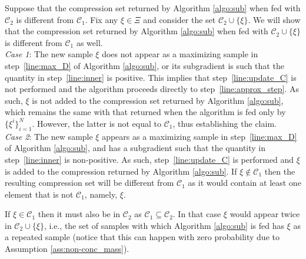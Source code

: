 \begin{enumerate}[wide, labelwidth=!, labelindent=0pt]
Suppose that the compression set returned by Algorithm \ref{algo:sub} when fed with $\mathcal{C}_2$ is different from 
$\mathcal{C}_1$. 
          Fix any $\xi \in \Xi$ and consider the set $\mathcal{C}_2 \cup \{\xi\}$. We will show that the compression set returned by Algorithm \ref{algo:sub} when fed with $\mathcal{C}_2 \cup \{\xi\}$ is different from $\mathcal{C}_1$ as well.\\
          \emph{Case 1}: The new sample $\xi$ does not appear as a maximizing sample in step~\ref{line:max_D} of Algorithm \ref{algo:sub}, or its subgradient is such that the quantity in step~\ref{line:inner} is positive. This implies that step~\ref{line:update_C} is not performed and the algorithm proceeds directly to step~\ref{line:approx_step}. As such, $\xi$ is not added to the compression set returned by Algorithm \ref{algo:sub}, which remains the same with that returned when the algorithm is fed only by $\{\xi^i\}_{i=1}^N$. However, the latter is not equal to $\mathcal{C}_1$, thus establishing the claim.\\  
	       \emph{Case 2}: The new sample $\xi$ appears as a maximizing sample in step~\ref{line:max_D} of Algorithm \ref{algo:sub}, and has a subgradient such that the quantity in step~\ref{line:inner} is non-positive. As such, step~\ref{line:update_C} is performed and $\xi$ is added to the compression returned by Algorithm \ref{algo:sub}.
          If $\xi \notin \mathcal{C}_1$ then the resulting compression set will be different from $\mathcal{C}_1$ as it would contain at least one element that is not $\mathcal{C}_1$, namely, $\xi$.
          
	       If $\xi \in \mathcal{C}_1$ then it must also be in $\mathcal{C}_2$ as $\mathcal{C}_1 \subseteq \mathcal{C}_2$. In that case $\xi$ would appear twice in $\mathcal{C}_2 \cup \{\xi\}$, i.e., the set of samples with which Algorithm \ref{algo:sub} is fed has $\xi$ as a repeated sample (notice that this can happen with zero probability due to Assumption \ref{ass:non-conc_mass}). 
                           

\end{enumerate}
